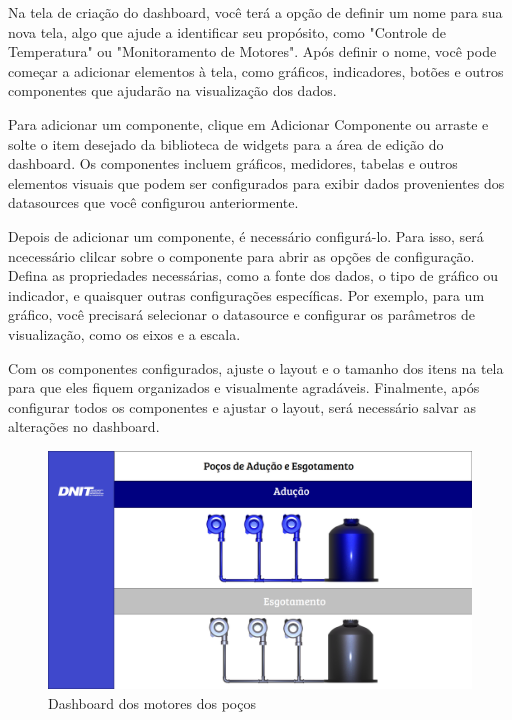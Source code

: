 Na tela de criação do dashboard, você terá a opção de definir um nome para sua nova tela, algo que ajude a identificar seu propósito, como "Controle de Temperatura" ou "Monitoramento de Motores". Após definir o nome, você pode começar a adicionar elementos à tela, como gráficos, indicadores, botões e outros componentes que ajudarão na visualização dos dados.

Para adicionar um componente, clique em Adicionar Componente ou arraste e solte o item desejado da biblioteca de widgets para a área de edição do dashboard. Os componentes incluem gráficos, medidores, tabelas e outros elementos visuais que podem ser configurados para exibir dados provenientes dos datasources que você configurou anteriormente.

Depois de adicionar um componente, é necessário configurá-lo. Para isso, será ncecessário clilcar sobre o componente para abrir as opções de configuração. Defina as propriedades necessárias, como a fonte dos dados, o tipo de gráfico ou indicador, e quaisquer outras configurações específicas. Por exemplo, para um gráfico, você precisará selecionar o datasource e configurar os parâmetros de visualização, como os eixos e a escala.

Com os componentes configurados, ajuste o layout e o tamanho dos itens na tela para que eles fiquem organizados e visualmente agradáveis. Finalmente, após configurar todos os componentes e ajustar o layout, será necessário salvar as alterações no dashboard. 

\begin{figure}[h]
	\centering
	\label{fig:Pocos_scada}
		\includegraphics[keepaspectratio=true,scale=0.2]{figuras/Supervisorio.png}
	\caption{Dashboard dos motores dos poços}
\end{figure}

